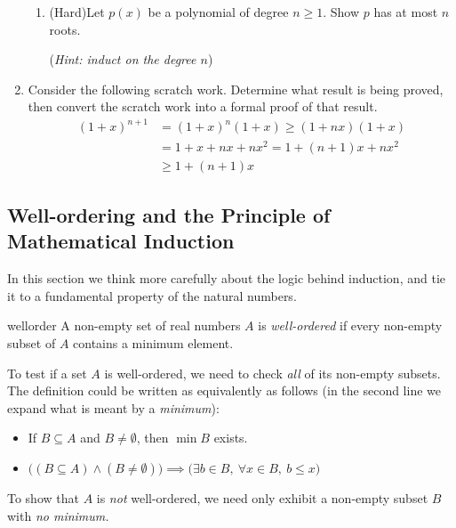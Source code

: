\begin{exercises}{}{}
\begin{enumerate}
\begin{enumerate}
			\item (Hard)\lstsp Let $p(x)$ be a polynomial of degree $n\ge 1$. Show $p$ has at most $n$ roots.\par
			(\emph{Hint: induct on the degree $n$})
		\end{enumerate}


		\item Consider the following scratch work. Determine what result is being proved, then convert the scratch work into a formal proof of that result.
	  \begin{align*}
	    (1+x)^{n+1}
	    &=(1+x)^n(1+x)\ge (1+nx)(1+x)\\
	    &=1+x+nx+nx^2=1+(n+1)x+nx^2\\
	    &\ge 1+(n+1)x
	  \end{align*}

	\end{enumerate}

\end{exercises}

\clearpage



\subsection{Well-ordering and the Principle of Mathematical Induction}\label{sec:wellorder}


In this section we think more carefully about the logic behind induction, and tie it to a fundamental property of the natural numbers.

\begin{defn}{}{wellorder}
	A non-empty set of real numbers $A$ is \emph{well-ordered} if every non-empty subset of $A$ contains a minimum element.
\end{defn}

To test if a set $A$ is well-ordered, we need to check \emph{all} of its non-empty subsets. The definition could be written as equivalently as follows (in the second line we expand what is meant by a \emph{minimum}):
\begin{itemize}
  \item If $B\subseteq A$ and $B\neq\emptyset$, then $\min B$ exists.
  \item $\bigl((B\subseteq A)\wedge (B\neq\emptyset)\bigr)\implies \bigl(\exists b\in B,\ \forall x\in B, \ b\le x\bigr)$
\end{itemize}
To show that $A$ is \emph{not} well-ordered, we need only exhibit a non-empty subset $B$ with \emph{no minimum.}

